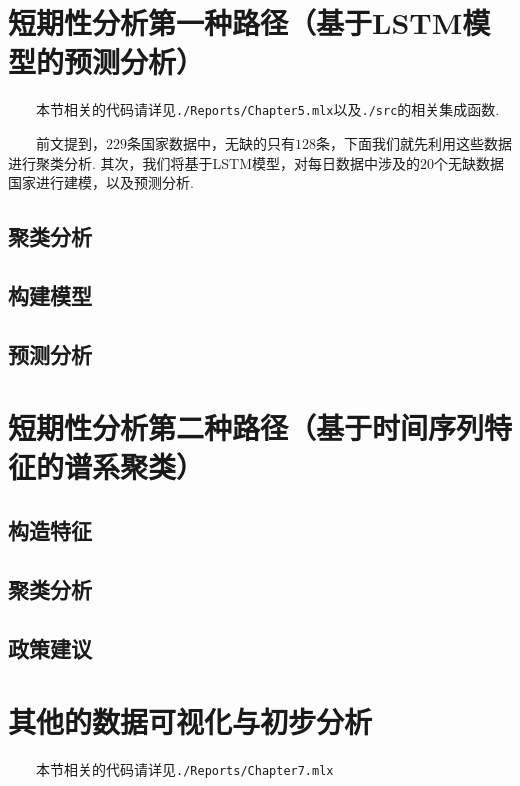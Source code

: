 \documentclass[a4paper, titlepage]{article}
\begin{document}
    \section{短期性分析第一种路径（基于LSTM模型的预测分析）}\label{第一种路径}
    　　本节相关的代码请详见\texttt{./Reports/Chapter5.mlx}以及\texttt{./src}的相关集成函数.

    　　前文提到，$229$条国家数据中，无缺的只有$128$条，下面我们就先利用这些数据进行聚类分析. 其次，我们将基于LSTM模型，对每日数据中涉及的$20$个无缺数据国家进行建模，以及预测分析.
    \subsection{聚类分析}
        
    \subsection{构建模型}
    \subsection{预测分析}
    \newpage
    \section{短期性分析第二种路径（基于时间序列特征的谱系聚类）}\label{第二种路径}
    \subsection{构造特征}
    \subsection{聚类分析}
    \subsection{政策建议}
    \newpage
    \section{其他的数据可视化与初步分析}\label{可视化}
    　　本节相关的代码请详见\texttt{./Reports/Chapter7.mlx}
\end{document}
